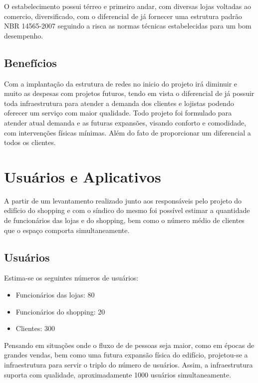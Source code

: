 \documentclass[	DIV=calc,%
							paper=a4,%
							fontsize=12pt,%
							onecolumn]{scrartcl}	 					%
\begin{document}
O estabelecimento possui térreo e primeiro andar, com diversas lojas voltadas ao comercio, diversificado, com o diferencial de já fornecer uma estrutura padrão NBR 14565-2007 seguindo a risca as normas técnicas estabelecidas para um bom desempenho.

\subsection{Benefícios}
Com a implantação da estrutura de redes no inicio do projeto irá diminuir e muito as despesas com projetos futuros, tendo em vista o diferencial de já possuir toda infraestrutura para atender a demanda dos clientes e lojistas podendo oferecer um serviço com maior qualidade.
Todo projeto foi formulado para atender atual demanda e as futuras expansões, visando conforto e comodidade, com intervenções físicas mínimas. Além do fato de proporcionar um diferencial a todos os clientes.


\section{Usuários e Aplicativos}
A partir de um levantamento realizado junto aos responsáveis pelo projeto do edifício do shopping e com o síndico do mesmo foi possível estimar a quantidade de funcionários das lojas e do shopping,
bem como o número médio de clientes que o espaço comporta simultaneamente.

\subsection{Usuários}
Estima-se os seguintes números de usuários:
\begin{itemize}
	\item Funcionários das lojas: 80
	\item Funcionários do shopping: 20
	\item Clientes: 300
\end{itemize}
Pensando em situações onde o fluxo de de pessoas seja maior, como em épocas de grandes vendas, bem como uma futura expansão física do edifício, projetou-se a infraestrutura para servir o triplo do número de usuários.
Assim, a infraestrutura suporta com qualidade, aproximadamente 1000 usuários simultaneamente.
\end{document}
